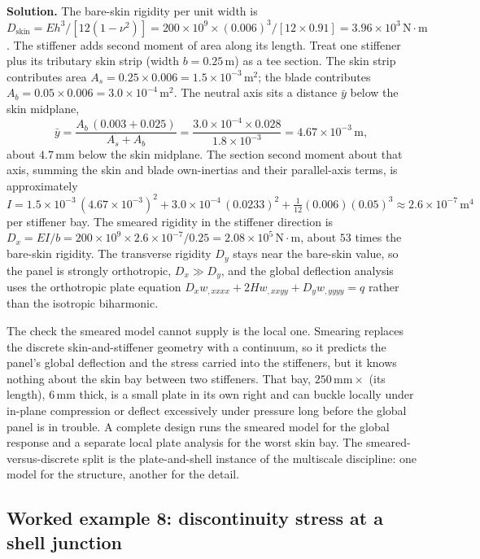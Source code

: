\textbf{Solution.} The bare-skin rigidity per unit width is $D_{\text{
skin}} = E h^3/[12(1-\nu^2)] = 200\times 10^9\times (0.006)^3/[12\times
0.91] = 3.96\times 10^3\,\text{N}\cdot\text{m}$. The stiffener adds
second moment of area along its length. Treat one stiffener plus its
tributary skin strip (width $b = 0.25\,\si{\meter}$) as a tee section.
The skin strip contributes area $A_s = 0.25\times 0.006 = 1.5\times
10^{-3}\,\text{m}^2$; the blade contributes $A_b = 0.05\times 0.006 =
3.0\times 10^{-4}\,\text{m}^2$. The neutral axis sits a distance
$\bar{y}$ below the skin midplane,
\[
\bar{y} = \frac{A_b\,(0.003 + 0.025)}{A_s + A_b}
= \frac{3.0\times 10^{-4}\times 0.028}{1.8\times 10^{-3}}
= 4.67\times 10^{-3}\,\text{m},
\]
about $4.7\,\si{\milli\meter}$ below the skin midplane. The section
second moment about that axis, summing the skin and blade own-inertias
and their parallel-axis terms, is approximately
\[
I = 1.5\times 10^{-3}\,(4.67\times 10^{-3})^2 + 3.0\times 10^{-4}\,
(0.0233)^2 + \tfrac{1}{12}(0.006)(0.05)^3 \approx 2.6\times 10^{-7}\,
\text{m}^4
\]
per stiffener bay. The smeared rigidity in the stiffener direction is
$D_x = E I/b = 200\times 10^9\times 2.6\times 10^{-7}/0.25 = 2.08\times
10^5\,\text{N}\cdot\text{m}$, about $53$ times the bare-skin rigidity.
The transverse rigidity $D_y$ stays near the bare-skin value, so the
panel is strongly orthotropic, $D_x \gg D_y$, and the global deflection
analysis uses the orthotropic plate equation $D_x w_{,xxxx} + 2H
w_{,xxyy} + D_y w_{,yyyy} = q$ rather than the isotropic biharmonic.

The check the smeared model cannot supply is the local one. Smearing
replaces the discrete skin-and-stiffener geometry with a continuum, so
it predicts the panel's global deflection and the stress carried into
the stiffeners, but it knows nothing about the skin bay between two
stiffeners. That bay, $250\,\si{\milli\meter}\times$ (its length),
$6\,\si{\milli\meter}$ thick, is a small plate in its own right and can
buckle locally under in-plane compression or deflect excessively under
pressure long before the global panel is in trouble. A complete design
runs the smeared model for the global response and a separate local
plate analysis for the worst skin bay. The smeared-versus-discrete
split is the plate-and-shell instance of the multiscale discipline:
one model for the structure, another for the detail.

\subsection*{Worked example 8: discontinuity stress at a shell junction}

